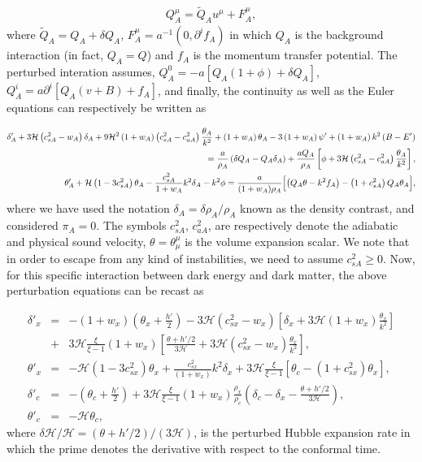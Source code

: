 \documentclass[superscriptaddress,oneolumn,secnumarabic,
amssymb,amsmath,nobibnotes,aps,prd,showpacs,nofootinbib]{revtex4}%
\begin{document}
\begin{eqnarray}
Q_{A}^{\mu} = \tilde{Q}_A u^{\mu} + F_A^{\mu},
\end{eqnarray}
where $\tilde{Q}_A = Q_A + \delta Q_A$, $F_A^{\mu} = a^{-1} (0, \partial^{i} f_A)$ in which $Q_A$ is the background interaction  (in fact, $Q_A = Q$) and $f_A$ is the momentum transfer potential. The perturbed interation assumes, $Q_A^0 = -a \left[Q_A (1+\phi)+\delta Q_A \right]$, $Q_A^i= a \partial^i \left[ Q_A (v+B) + f_A\right]$, and finally, the continuity as well as the Euler equations can respectively be written as

\begin{eqnarray}
\delta_A^{\prime} + 3 \mathcal{H} \left(c_{sA}^2 - w_A \right) \delta_A + 9 \mathcal{H}^2 \left(1+w_A \right) \left(c_{sA}^2- c_{aA}^2 \right)\frac{\theta_A}{k^2} + \left(1+w_A \right) \theta_A -3 \left(1+w_A \right) \psi^{\prime} + \left(1+w_A \right) k^2 \left(B- E^{\prime} \right)\nonumber\\ = \frac{a}{\rho_A} \left(\delta Q_A - Q_A \delta _A \right) + \frac{a Q_A}{\rho_A} \left[\phi + 3 \mathcal{H} \left(c_{sA}^2- c_{aA}^2 \right)\frac{\theta_A}{k^2}\right],\\
%
%
\theta_A^{\prime} + \mathcal{H} \left(1-3 c_{sA}^2  \right)\theta_A - \frac{c_{sA}^2}{1+w_A} k^2 \delta_A -k^2 \phi = \frac{a}{(1+w_A)\rho_A} \Bigl[ \left(Q_A \theta -k^2 f_A \right) - \left(1+ c_{sA}^2 \right) Q_A \theta_A \Bigr],
\end{eqnarray}
where we have used the notation $\delta_A = \delta \rho_A/\rho_A$ known as the density contrast, and considered $\pi_A = 0$. The symbols $c_{sA}^2$, $c_{aA}^2$,
are respectively denote the adiabatic and physical sound velocity, $\theta = \theta_{\mu}^{\mu}$ is the volume expansion scalar. We note that in order to escape from any kind of instabilities, we need to assume $c_{sA}^2 \geq 0$. Now, for this specific interaction between dark energy and dark matter, the above perturbation equations can be recast as

\begin{eqnarray}
\delta'_x
&=&-(1+w_x)\left(\theta_x+\frac{h'}{2}\right)
-3\mathcal{H}(c^2_{sx}-w_x)\left[\delta_x+3\mathcal{H}(1+w_x)\frac{\theta_x}{k^2}\right] \nonumber \\
&+&3\mathcal{H}\frac{\xi}{\xi-1}(1+w_x)\left[\frac{\theta+h'/2}{3\mathcal{H}}+3\mathcal{H}(c^2_{sx}-w_x)\frac{\theta_x}{k^2}\right], \\
\theta'_x
&=&-\mathcal{H}(1-3c^2_{sx})\theta_x+\frac{c^2_{sx}}{(1+w_x)}k^2\delta_x
+3\mathcal{H}\frac{\xi}{\xi-1}\left[\theta_c-(1+c^2_{sx})\theta_x\right], \\
\delta'_c
&=&-\left(\theta_c+\frac{h'}{2}\right)
+3\mathcal{H}\frac{\xi}{\xi-1}(1+w_x)\frac{\rho_x}{\rho_c}\left(\delta_c-\delta_x-\frac{\theta+h'/2}{3\mathcal{H}}\right), \label{delta_c}\\
\theta'_c
&=&-\mathcal{H}\theta_c,
\label{eq:perturbation}
\end{eqnarray}
where $\delta\mathcal{H}/\mathcal{H}=(\theta+h'/2)/(3\mathcal{H})$, is the perturbed Hubble expansion rate \cite{ref:Gavela2010} in which the prime denotes the derivative with respect to the conformal time.
\end{document}
